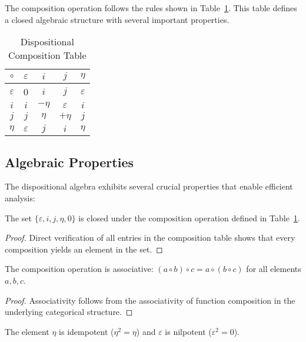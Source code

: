\documentclass[journal]{IEEEtran}
\begin{document}
The composition operation follows the rules shown in Table~\ref{tab:composition}. This table defines a closed algebraic structure with several important properties.

\begin{table}[t]
\centering
\caption{Dispositional Composition Table}
\label{tab:composition}
\begin{tabular}{c|cccc}
\toprule
$\circ$ & $\varepsilon$ & $i$ & $j$ & $\eta$ \\
\midrule
$\varepsilon$ & 0 & $i$ & $j$ & $\varepsilon$ \\
$i$ & $i$ & $-\eta$ & $\varepsilon$ & $i$ \\
$j$ & $j$ & $\eta$ & $+\eta$ & $j$ \\
$\eta$ & $\varepsilon$ & $j$ & $i$ & $\eta$ \\
\bottomrule
\end{tabular}
\end{table}

\subsection{Algebraic Properties}

The dispositional algebra exhibits several crucial properties that enable efficient analysis:

\begin{theorem}[Closure]
The set $\{\varepsilon, i, j, \eta, 0\}$ is closed under the composition operation defined in Table~\ref{tab:composition}.
\end{theorem}

\begin{proof}
Direct verification of all entries in the composition table shows that every composition yields an element in the set.
\end{proof}

\begin{theorem}[Associativity]
The composition operation is associative: $(a \circ b) \circ c = a \circ (b \circ c)$ for all elements $a, b, c$.
\end{theorem}

\begin{proof}
Associativity follows from the associativity of function composition in the underlying categorical structure.
\end{proof}

\begin{theorem}
The element $\eta$ is idempotent ($\eta^2 = \eta$) and $\varepsilon$ is nilpotent ($\varepsilon^2 = 0$).
\end{theorem}
\end{document}
